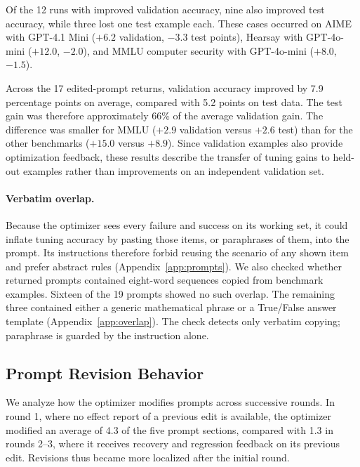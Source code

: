 \documentclass[11pt]{article}
\begin{document}
Of the 12 runs with improved validation accuracy, nine also improved test accuracy, while three lost one test example each. These cases occurred on AIME with GPT-4.1 Mini ($+6.2$ validation, $-3.3$ test points), Hearsay with GPT-4o-mini ($+12.0$, $-2.0$), and MMLU computer security with GPT-4o-mini ($+8.0$, $-1.5$).

Across the 17 edited-prompt returns, validation accuracy improved by 7.9 percentage points on average, compared with 5.2 points on test data. The test gain was therefore approximately 66\% of the average validation gain. The difference was smaller for MMLU ($+2.9$ validation versus $+2.6$ test) than for the other benchmarks ($+15.0$ versus $+8.9$).
Since validation examples also provide optimization feedback, these results describe the transfer of tuning gains to held-out examples rather than improvements on an independent validation set.

\paragraph{Verbatim overlap.}
Because the optimizer sees every failure and success on its working set, it could inflate tuning accuracy by pasting those items, or paraphrases of them, into the prompt. Its instructions therefore forbid reusing the scenario of any shown item and prefer abstract rules (Appendix~\ref{app:prompts}). We also checked whether returned prompts contained eight-word sequences copied from benchmark examples. Sixteen of the 19 prompts showed no such overlap. The remaining three contained either a generic mathematical phrase or a True/False answer template (Appendix~\ref{app:overlap}). The check detects only verbatim copying; paraphrase is guarded by the instruction alone.

\subsection{Prompt Revision Behavior}
\label{sec:edits}

We analyze how the optimizer modifies prompts across successive rounds. In round 1, where no effect report of a previous edit is available, the optimizer modified an average of 4.3 of the five prompt sections, compared with 1.3 in rounds 2--3, where it receives recovery and regression feedback on its previous edit. Revisions thus became more localized after the initial round.

\end{document}
